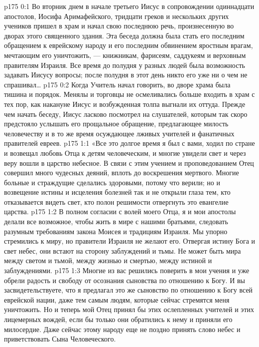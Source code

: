 \author{Комиссия срединников}
\vs p175 0:1 Во вторник днем в начале третьего Иисус в сопровождении одиннадцати апостолов, Иосифа Аримафейского, тридцати греков и нескольких других учеников пришел в храм и начал свою последнюю речь, произнесенную во дворах этого священного здания. Эта беседа должна была стать его последним обращением к еврейскому народу и его последним обвинением яростным врагам, мечтающим его уничтожить, --- книжникам, фарисеям, саддукеям и верховным правителям Израиля. Все время до полудня у разных людей была возможность задавать Иисусу вопросы; после полудня в этот день никто его уже ни о чем не спрашивал\ldots
\vs p175 0:2 Когда Учитель начал говорить, во дворе храма была тишина и порядок. Менялы и торговцы не осмеливались больше входить в храм с тех пор, как накануне Иисус и возбужденная толпа выгнали их оттуда. Прежде чем начать беседу, Иисус ласково посмотрел на слушателей, которым так скоро предстояло услышать его прощальное обращение, предлагающее милость человечеству и в то же время осуждающее лживых учителей и фанатичных правителей евреев.
\vs p175 1:1 «Все это долгое время я был с вами, ходил по стране и возвещал любовь Отца к детям человеческим, и многие увидели свет и через веру вошли в царство небесное. В связи с этим учением и проповедованием Отец совершил много чудесных деяний, вплоть до воскрешения мертвого. Многие больные и страждущие сделались здоровыми, потому что верили; но и возвещение истины и исцеления болезней так и не открыли глаза тем, кто отказывается видеть свет, кто полон решимости отвергнуть это евангелие царства.
\vs p175 1:2 В полном согласии с волей моего Отца, я и мои апостолы делали все возможное, чтобы жить в мире с нашими братьями, следовать разумным требованиям закона Моисея и традициям Израиля. Мы упорно стремились к миру, но правители Израиля не желают его. Отвергая истину Бога и свет небес, они встают на сторону заблуждений и тьмы. Не может быть мира между светом и тьмой, между жизнью и смертью, между истиной и заблуждениями.
\vs p175 1:3 Многие из вас решились поверить в мои учения и уже обрели радость и свободу от осознания сыновства по отношению к Богу. И вы засвидетельствуете, что я предлагал это же сыновство по отношению к Богу всей еврейской нации, даже тем самым людям, которые сейчас стремятся меня уничтожить. Но и теперь мой Отец принял бы этих ослепленных учителей и этих лицемерных вождей, если бы только они обратились к нему и приняли его милосердие. Даже сейчас этому народу еще не поздно принять слово небес и приветствовать Сына Человеческого.
